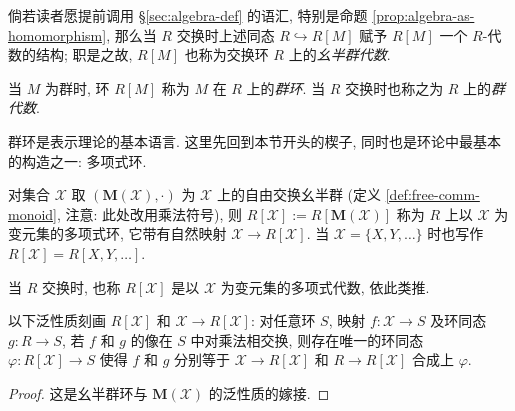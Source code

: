 倘若读者愿提前调用 \S\ref{sec:algebra-def} 的语汇, 特别是命题 \ref{prop:algebra-as-homomorphism}, 那么当 $R$ 交换时上述同态 $R \hookrightarrow R[M]$ 赋予 $R[M]$ 一个 $R$-代数的结构; 职是之故, $R[M]$ 也称为交换环 $R$ 上的\emph{幺半群代数}.

\begin{definition}\label{def:group-ring}
	当 $M$ 为群时, 环 $R[M]$ 称为 $M$ 在 $R$ 上的\emph{群环}. 当 $R$ 交换时也称之为 $R$ 上的\emph{群代数}.
\end{definition}

群环是表示理论的基本语言. 这里先回到本节开头的楔子, 同时也是环论中最基本的构造之一: 多项式环.
\begin{definition}[多项式环] 
	对集合 $\mathcal{X}$ 取 $(\mathbf{M}(\mathcal{X}), \cdot)$ 为 $\mathcal{X}$ 上的自由交换幺半群 (定义 \ref{def:free-comm-monoid}, 注意: 此处改用乘法符号), 则 $R[\mathcal{X}] := R[\mathbf{M}(\mathcal{X})]$ 称为 $R$ 上以 $\mathcal{X}$ 为变元集的多项式环, 它带有自然映射 $\mathcal{X} \to R[\mathcal{X}]$. 当 $\mathcal{X} = \{X, Y, \ldots\}$ 时也写作 $R[\mathcal{X}] = R[X, Y, \ldots]$.
\end{definition}
当 $R$ 交换时, 也称 $R[\mathcal{X}]$ 是以 $\mathcal{X}$ 为变元集的多项式代数, 依此类推.

\begin{proposition}\label{prop:polynomial-ring-universal}
	以下泛性质刻画 $R[\mathcal{X}]$ 和 $\mathcal{X} \to R[\mathcal{X}]$: 对任意环 $S$, 映射 $f: \mathcal{X} \to S$ 及环同态 $g: R \to S$, 若 $f$ 和 $g$ 的像在 $S$ 中对乘法相交换, 则存在唯一的环同态 $\varphi: R[\mathcal{X}] \to S$ 使得 $f$ 和 $g$ 分别等于 $\mathcal{X} \to R[\mathcal{X}]$ 和 $R \to R[\mathcal{X}]$ 合成上 $\varphi$.
\end{proposition}
\begin{proof}
	这是幺半群环与 $\mathbf{M}(\mathcal{X})$ 的泛性质的嫁接.
\end{proof}

